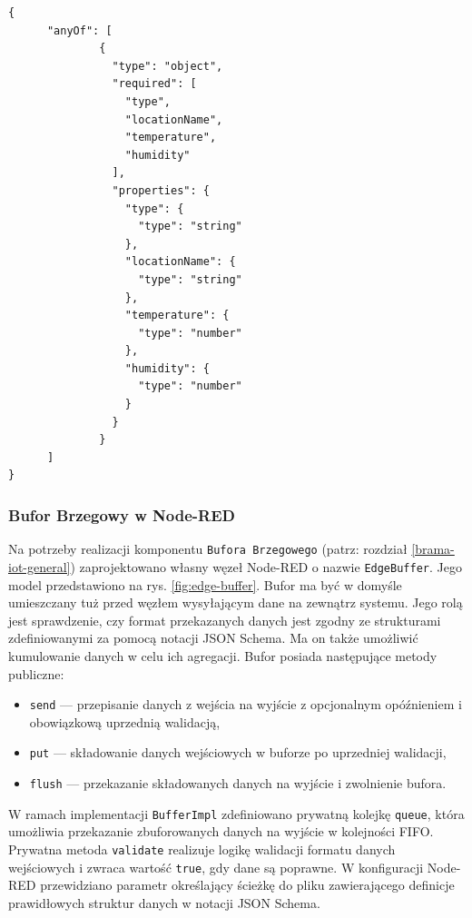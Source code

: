 \documentclass[a4paper, 12pt, twoside]{article}
\begin{document}
\begin{lstlisting}[caption={Przykład definicji obiektu JSON w notacji JSON Schema dla 
      struktury \texttt{AirMeasurement}}, label={lst:json-schema}]
{
      "anyOf": [
              {
                "type": "object",
                "required": [
                  "type",
                  "locationName",
                  "temperature",
                  "humidity"
                ],
                "properties": {
                  "type": {
                    "type": "string"
                  },
                  "locationName": {
                    "type": "string"
                  },
                  "temperature": {
                    "type": "number"
                  },
                  "humidity": {
                    "type": "number"
                  }
                }
              }
      ]
}    
\end{lstlisting}

\subsubsection{Bufor Brzegowy w Node-RED}
Na potrzeby realizacji komponentu \texttt{Bufora Brzegowego} (patrz: rozdział \ref{brama-iot-general})
zaprojektowano własny węzeł Node-RED o nazwie \texttt{EdgeBuffer}.
Jego model przedstawiono na rys. \ref{fig:edge-buffer}.
Bufor ma być w domyśle umieszczany tuż przed węzłem wysyłającym dane na
zewnątrz systemu. Jego rolą jest sprawdzenie, czy format
przekazanych danych jest zgodny ze strukturami zdefiniowanymi za pomocą notacji JSON Schema.
Ma on także umożliwić
kumulowanie danych w celu ich agregacji. Bufor posiada następujące
metody publiczne:
\begin{itemize}
      \itemsep0em
      \item \texttt{send} --- przepisanie danych z wejścia na wyjście z
            opcjonalnym opóźnieniem i obowiązkową uprzednią walidacją,
      \item \texttt{put} --- składowanie danych wejściowych w buforze po uprzedniej walidacji,
      \item \texttt{flush} --- przekazanie składowanych danych na wyjście
            i zwolnienie bufora.
\end{itemize}
\noindent W ramach implementacji \texttt{BufferImpl} zdefiniowano
prywatną kolejkę \texttt{queue}, która umożliwia przekazanie zbuforowanych
danych na wyjście w kolejności FIFO. Prywatna metoda \texttt{validate} realizuje
logikę walidacji formatu danych wejściowych i zwraca wartość \texttt{true},
gdy dane są poprawne. W konfiguracji Node-RED przewidziano parametr określający
ścieżkę do pliku zawierającego definicje prawidłowych struktur danych w notacji JSON Schema.
\end{document}
